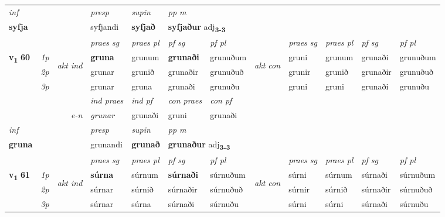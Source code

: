 \begin{longtable}[l]{X>{\footnotesize\itshape}llXXXXlXXXX}
\cmidrule{4-7}
   {\textit{inf}} & &     & \textit{presp} & \textit{supin}  & \textit{pp m} \\*
  {\textbf{syfja}} & &     & syfjandi &  \textbf{syfjað}  & \multicolumn{2}{l}{\textbf{syfjaður} adj\textbf{\textsubscript{3-3}}} \\*

\midrule

 & &   & \textit{praes sg}  & \textit{praes pl}    & \textit{ pf sg} & \textit{pf pl} & & \textit{praes sg}  & \textit{praes pl}    & \textit{pf sg} & \textit{pf pl }  \\ \cmidrule{4-7} \cmidrule{9-12}
 \multirow{2}{*}{{{\textbf{v{\textsubscript{1}}} \Large{\textbf{60}}}}}  & 1p & \multirow{3}{*}{\begin{turn}{90}\textit{akt ind}\end{turn}} & \textbf{gruna} & grunum & \textbf{grunaði} & grunuðum & \multirow{3}{*}{\begin{turn}{90}\textit{akt con}\end{turn}} &gruni & grunum & grunaði & grunuðum\\*
 & 2p &  &  grunar  & grunið & grunaðir & grunuðuð & & grunir & grunið & grunaðir & grunuðuð \\*
 & 3p &  & grunar & gruna & grunaði & grunuðu & & gruni & gruni& grunaði & grunuðu \\*
\cmidrule{4-7} \cmidrule{9-12}

   && &  \textit{ind praes} & \textit{ind pf} & \textit{con praes} & \textit{con pf} \\*
\multicolumn{3}{r}{\textit{e-n}} & grunar & grunaði & gruni & grunaði \\*

\cmidrule{4-7}
   {\textit{inf}} & &     & \textit{presp} & \textit{supin}  & \textit{pp m} \\*
  {\textbf{gruna}} & &     & grunandi &  \textbf{grunað}  & \multicolumn{2}{l}{\textbf{grunaður} adj\textbf{\textsubscript{3-3}}} \\*

\midrule

 & &   & \textit{praes sg}  & \textit{praes pl}    & \textit{ pf sg} & \textit{pf pl} & & \textit{praes sg}  & \textit{praes pl}    & \textit{pf sg} & \textit{pf pl }  \\ \cmidrule{4-7} \cmidrule{9-12}
 \multirow{2}{*}{{{\textbf{v{\textsubscript{1}}} \Large{\textbf{61}}}}}  & 1p & \multirow{3}{*}{\begin{turn}{90}\textit{akt ind}\end{turn}} & \textbf{súrna} & súrnum & \textbf{súrnaði} & súrnuðum & \multirow{3}{*}{\begin{turn}{90}\textit{akt con}\end{turn}} &súrni & súrnum & súrnaði & súrnuðum\\*
 & 2p &  &  súrnar  & súrnið & súrnaðir & súrnuðuð & & súrnir & súrnið & súrnaðir & súrnuðuð \\*
 & 3p &  & súrnar & súrna & súrnaði & súrnuðu & & súrni & súrni& súrnaði & súrnuðu \\*
\cmidrule{4-7} \cmidrule{9-12}


\end{longtable}
